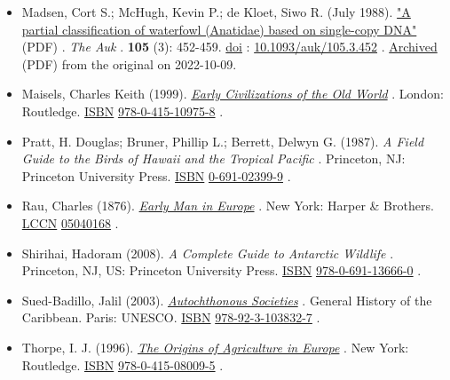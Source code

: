 \documentclass[11pt,a4paper]{article}
\begin{document}
\begin{itemize}
\item Madsen, Cort S.; McHugh, Kevin P.; de Kloet, Siwo R. (July 1988). \href{https://sora.unm.edu/sites/default/files/journals/auk/v105n03/p0452-p0459.pdf}{"A partial classification of waterfowl (Anatidae) based on single-copy DNA"} (PDF) . \textit{The Auk} . \textbf{105} (3): 452-459. \href{/wiki/Doi\_\%28identifier\%29}{doi} : \href{https://doi.org/10.1093\%2Fauk\%2F105.3.452}{10.1093/auk/105.3.452} . \href{https://ghostarchive.org/archive/20221009/https://sora.unm.edu/sites/default/files/journals/auk/v105n03/p0452-p0459.pdf}{Archived} (PDF) from the original on 2022-10-09.
\item Maisels, Charles Keith (1999). \href{https://books.google.com/books?id=I2dgI2ijww8C\&pg=PA42}{\textit{Early Civilizations of the Old World}} . London: Routledge. \href{/wiki/ISBN\_\%28identifier\%29}{ISBN} \href{/wiki/Special:BookSources/978-0-415-10975-8}{978-0-415-10975-8} .
\item Pratt, H. Douglas; Bruner, Phillip L.; Berrett, Delwyn G. (1987). \textit{A Field Guide to the Birds of Hawaii and the Tropical Pacific} . Princeton, NJ: Princeton University Press. \href{/wiki/ISBN\_\%28identifier\%29}{ISBN} \href{/wiki/Special:BookSources/0-691-02399-9}{0-691-02399-9} .
\item Rau, Charles (1876). \href{https://books.google.com/books?id=9XBgAAAAIAAJ\&pg=133}{\textit{Early Man in Europe}} . New York: Harper \& Brothers. \href{/wiki/LCCN\_\%28identifier\%29}{LCCN} \href{https://lccn.loc.gov/05040168}{05040168} .
\item Shirihai, Hadoram (2008). \textit{A Complete Guide to Antarctic Wildlife} . Princeton, NJ, US: Princeton University Press. \href{/wiki/ISBN\_\%28identifier\%29}{ISBN} \href{/wiki/Special:BookSources/978-0-691-13666-0}{978-0-691-13666-0} .
\item Sued-Badillo, Jalil (2003). \href{https://books.google.com/books?id=zexcW7q-4LgC\&pg=PA65}{\textit{Autochthonous Societies}} . General History of the Caribbean. Paris: UNESCO. \href{/wiki/ISBN\_\%28identifier\%29}{ISBN} \href{/wiki/Special:BookSources/978-92-3-103832-7}{978-92-3-103832-7} .
\item Thorpe, I. J. (1996). \href{https://books.google.com/books?id=YA-EAgAAQBAJ\&pg=PA68}{\textit{The Origins of Agriculture in Europe}} . New York: Routledge. \href{/wiki/ISBN\_\%28identifier\%29}{ISBN} \href{/wiki/Special:BookSources/978-0-415-08009-5}{978-0-415-08009-5} .
\end{itemize}
\end{document}
